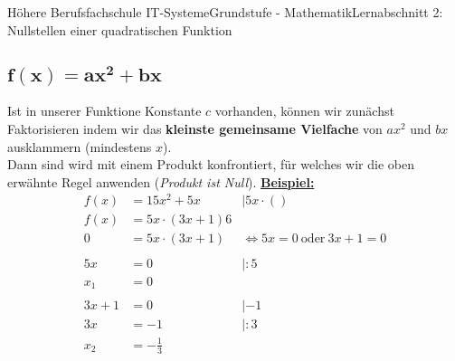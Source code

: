 \documentclass[11pt,twocolumn,oneside,openany,headings=optiontotoc,11pt,numbers=noenddot]{article}
\begin{document}
\begin{worksheet}{Höhere Berufsfachschule IT-Systeme}{Grundstufe - Mathematik}{Lernabschnitt 2: Nullstellen einer quadratischen Funktion}
		\subsection{\(\mathbf{f(x) = ax^2 + bx}\)}
		Ist in unserer Funktione Konstante \(c\) vorhanden, können wir zunächst Faktorisieren indem wir das \textbf{kleinste gemeinsame Vielfache} von \(ax^2\) und \(bx\) ausklammern (mindestens \(x\)).\\
		Dann sind wird mit einem Produkt konfrontiert, für welches wir die oben erwähnte Regel anwenden (\textit{Produkt ist Null}).
		\underline{\textbf{Beispiel:}}
		\begin{align*}
			f(x) & = 15x^2 + 5x & |5x\cdot()\\
			f(x) & = 5x\cdot(3x + 1) 6\\
			0 & = 5x\cdot(3x+1) & \Leftrightarrow 5x = 0\ \text{oder}\ 3x+1 = 0\\
			\\
			5x & = 0  & |:5\\
			x_1 & = 0\\
			\\
			3x + 1 & = 0 & | -1\\
			3x & = -1 & |:3\\
			x_2 & = -\frac{1}{3}
		\end{align*}
	\end{worksheet}
\end{document}
